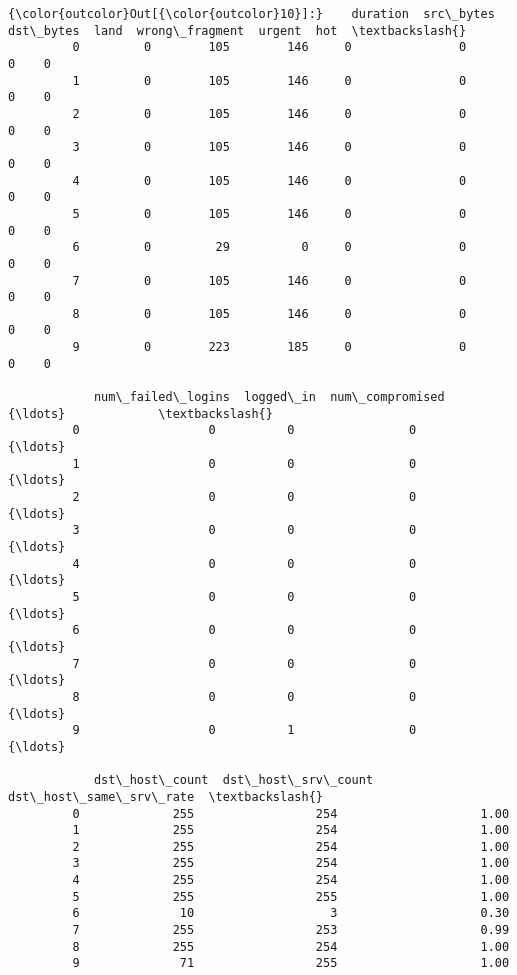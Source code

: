 \documentclass[11pt]{article}
\begin{document}
\begin{Verbatim}[commandchars=\\\{\}]
{\color{outcolor}Out[{\color{outcolor}10}]:}    duration  src\_bytes  dst\_bytes  land  wrong\_fragment  urgent  hot  \textbackslash{}
         0         0        105        146     0               0       0    0   
         1         0        105        146     0               0       0    0   
         2         0        105        146     0               0       0    0   
         3         0        105        146     0               0       0    0   
         4         0        105        146     0               0       0    0   
         5         0        105        146     0               0       0    0   
         6         0         29          0     0               0       0    0   
         7         0        105        146     0               0       0    0   
         8         0        105        146     0               0       0    0   
         9         0        223        185     0               0       0    0   
         
            num\_failed\_logins  logged\_in  num\_compromised            {\ldots}             \textbackslash{}
         0                  0          0                0            {\ldots}              
         1                  0          0                0            {\ldots}              
         2                  0          0                0            {\ldots}              
         3                  0          0                0            {\ldots}              
         4                  0          0                0            {\ldots}              
         5                  0          0                0            {\ldots}              
         6                  0          0                0            {\ldots}              
         7                  0          0                0            {\ldots}              
         8                  0          0                0            {\ldots}              
         9                  0          1                0            {\ldots}              
         
            dst\_host\_count  dst\_host\_srv\_count  dst\_host\_same\_srv\_rate  \textbackslash{}
         0             255                 254                    1.00   
         1             255                 254                    1.00   
         2             255                 254                    1.00   
         3             255                 254                    1.00   
         4             255                 254                    1.00   
         5             255                 255                    1.00   
         6              10                   3                    0.30   
         7             255                 253                    0.99   
         8             255                 254                    1.00   
         9              71                 255                    1.00   
         

\end{Verbatim}
\end{document}
